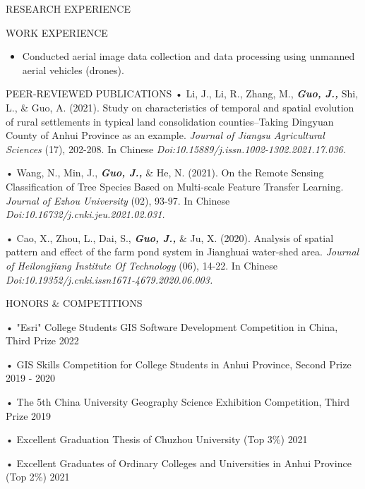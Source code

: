 \documentclass{resume}
\begin{document}
\begin{ResumeSection}{RESEARCH EXPERIENCE}
\begin{ResumeSection}{WORK EXPERIENCE}
    \begin{itemize}
    
        \item Conducted aerial image data collection and data processing using unmanned aerial vehicles (drones).

    \end{itemize}



\vspace{1mm}  
\begin{ResumeSection}{PEER-REVIEWED PUBLICATIONS}
• Li, J., Li, R., Zhang, M., \textbf{\textit{Guo, J.,}} Shi, L., \& Guo, A. (2021). Study on characteristics of temporal and spatial evolution of rural settlements in typical land consolidation counties--Taking Dingyuan County of Anhui Province as an example. \textit{Journal of Jiangsu Agricultural Sciences} (17), 202-208. In Chinese \textit{Doi:10.15889/j.issn.1002-1302.2021.17.036.}

• Wang, N., Min, J., \textbf{\textit{Guo, J.,}} \& He, N. (2021). On the Remote Sensing Classification of Tree Species Based on Multi-scale Feature Transfer Learning. \textit{Journal of Ezhou University} (02), 93-97. In Chinese \textit{Doi:10.16732/j.cnki.jeu.2021.02.031.}

• Cao, X., Zhou, L., Dai, S., \textbf{\textit{Guo, J.,}} \& Ju, X. (2020). Analysis of spatial pattern and effect of the farm pond system in Jianghuai water-shed area. \textit{Journal of Heilongjiang Institute Of Technology} (06), 14-22. In Chinese \textit{Doi:10.19352/j.cnki.issn1671-4679.2020.06.003.}


\end{ResumeSection}



\vspace{-2mm}  
\begin{ResumeSection}{HONORS \& COMPETITIONS}

• "Esri" College Students GIS Software Development Competition in China, Third Prize \hfill{2022}

• GIS Skills Competition for College Students in Anhui Province, Second Prize \hfill{2019 - 2020}

• The 5th China University Geography Science Exhibition Competition, Third Prize \hfill{2019}

• Excellent Graduation Thesis of Chuzhou University (Top 3\%) \hfill{2021}

• Excellent Graduates of Ordinary Colleges and Universities in Anhui Province (Top 2\%) \hfill{2021}


\end{ResumeSection}
\end{ResumeSection}
\end{ResumeSection}
\end{document}
